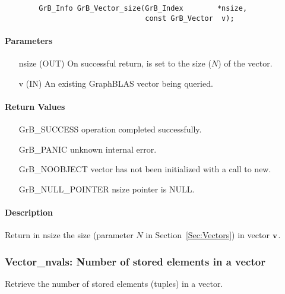 \begin{verbatim}
        GrB_Info GrB_Vector_size(GrB_Index        *nsize,
                                 const GrB_Vector  v);
\end{verbatim}

\paragraph{Parameters}

\begin{itemize}[leftmargin=1.1in]
    \item[{\sf nsize}] ({\sf OUT}) On successful return, is set to the size ($N$) 
                                   of the vector.
    \item[{\sf v}]     ({\sf IN})  An existing GraphBLAS vector being queried.
\end{itemize}

\paragraph{Return Values}

\begin{itemize}[leftmargin=2.1in]
\item[{\sf GrB\_SUCCESS}]   operation completed successfully.
\item[{\sf GrB\_PANIC}]     unknown internal error.
\item[{\sf GrB\_NOOBJECT}]  vector has not been initialized with a call to {\sf new}.
\item[{\sf GrB\_NULL\_POINTER}]    {\sf nsize} pointer is {\sf NULL}.
\end{itemize}

\paragraph{Description}

Return in {\sf nsize} the size (parameter $N$ in Section~\ref{Sec:Vectors}) in vector ${\bf v}$.

\subsubsection{{\sf Vector\_nvals}: Number of stored elements in a vector}

Retrieve the number of stored elements (tuples) in a vector.

